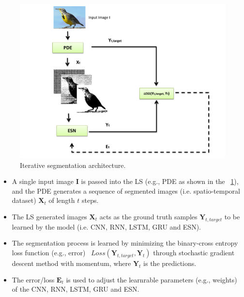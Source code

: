 \documentclass{WitsPhysicsReport}
\begin{document}
\begin{figure}[H]
\centering
\includegraphics[width=1\textwidth]{Figure/ESN.pdf}
\caption{Iterative segmentation architecture.}
\label{fig:research_design}
\end{figure}

\begin{itemize}
    \item A single input image $\mathbf{I}$ is passed into the LS (e.g., PDE as shown in the ~\ref{fig:research_design}), and the PDE generates a sequence of segmented images (i.e. spatio-temporal dataset) $\mathbf{X}_{t}$ of length $t$ steps.
    \item The LS generated images $\mathbf{X}_{t}$ acts as the ground truth samples $\mathbf{Y}_{t,target}$ 
    to be learned by the model (i.e. CNN, RNN, LSTM, GRU and ESN).
    \item The segmentation process is learned by minimizing the binary-cross entropy loss function (e.g., error) ~$Loss(\mathbf{Y}_{t, target}, \mathbf{Y}_{t})$ through stochastic gradient descent method with momentum, where $\mathbf{Y}_{t}$ is the predictions.
    \item The error/loss $\mathbf{E}_{t}$ is used to adjust the learnrable parameters (e.g., weights) of the CNN, RNN, LSTM, GRU and ESN.
\end{itemize}
\end{document}
